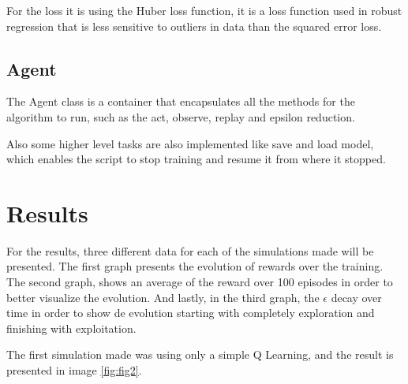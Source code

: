 \documentclass{article}
\begin{document}
For the loss it is using the Huber loss function, it is a loss function used in robust regression that is less sensitive to outliers in data than the squared error loss.

\subsection{Agent}
The Agent class is a container that encapsulates all the methods for the algorithm to run, such as the act, observe, replay and epsilon reduction.

Also some higher level tasks are also implemented like save and load model, which enables the script to stop training and resume it from where it stopped.

\section{Results}
For the results, three different data for each of the simulations made will be presented. The first graph presents the evolution of rewards over the training. The second graph, shows an average of the reward over 100 episodes in order to better visualize the evolution. And lastly, in the third graph, the $\epsilon$ decay over time in order to show de evolution starting with completely exploration and finishing with exploitation.

The first simulation made was using only a simple Q Learning, and the result is presented in image \ref{fig:fig2}.
\end{document}
